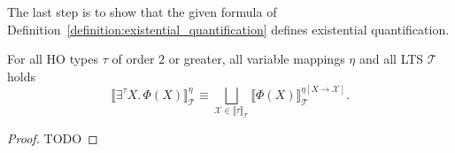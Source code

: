 The last step is to show that the given formula of Definition~\ref{definition:existential_quantification} defines
existential quantification.

\begin{lemma}
    \label{lemma:existential_quantifier}
    For all HO types $\tau$ of order $2$ or greater, all variable mappings $\eta$ and all LTS $\mathcal{T}$ holds
    \[\llbracket \exists^\tau X.\,\Phi(X)\rrbracket^\eta_\mathcal{T} \equiv \underset{\mathcal{X} \in \llbracket \tau
    \rrbracket_\mathcal{T}}{\bigsqcup} \llbracket \Phi(X) \rrbracket^{\eta[X\rightarrow \mathcal{X}]}_\mathcal{T}.\]
\end{lemma}

\begin{proof}
    TODO
\end{proof}